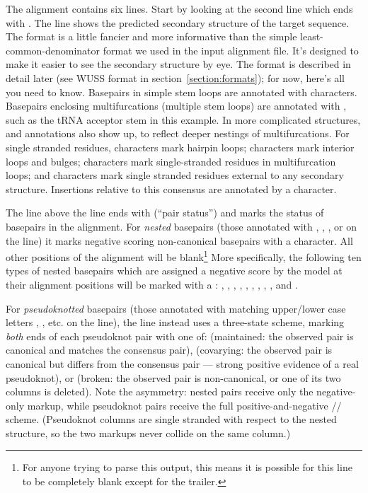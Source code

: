 The alignment contains six lines. Start by looking at the second line
which ends with .  The line shows the predicted secondary
structure of the target sequence. The format is a little fancier and
more informative than the simple least-common-denominator format we
used in the input alignment file. It's designed to make it easier to
see the secondary structure by eye. The format is described in detail
later (see WUSS format in section~\ref{section:formats}); for now,
here's all you need to know. Basepairs in simple stem loops are
annotated with \otext{<>} characters. Basepairs enclosing
multifurcations (multiple stem loops) are annotated with \otext{()},
such as the tRNA acceptor stem in this example. In more complicated
structures, \otext{[]} and \otext{\{\}} annotations also show up, to
reflect deeper nestings of multifurcations. For single stranded
residues, \otext{\_} characters mark hairpin loops; \otext{-}
characters mark interior loops and bulges; \otext{,} characters mark
single-stranded residues in multifurcation loops; and \otext{:}
characters mark single stranded residues external to any secondary
structure. Insertions relative to this consensus are annotated by a
 character.

The line above the  line ends with  (``pair
status'') and marks the status of basepairs in the alignment. For
\emph{nested} basepairs (those annotated with \otext{<>}, \otext{()},
\otext{[]}, or \otext{\{\}} on the  line) it marks negative
scoring non-canonical basepairs with a  character. All other
positions of the alignment will be
blank\footnote{For anyone trying to parse this output, this means it
is possible for this line to be completely blank except for the
 trailer.} More specifically, the following ten types of
nested basepairs which are assigned a negative score by the model at
their alignment positions will be marked with a : ,
, , , , ,
, , , and .

For \emph{pseudoknotted} basepairs (those annotated with matching
upper/lower case letters , , etc. on the
 line), the  line instead uses a three-state
scheme, marking \emph{both} ends of each pseudoknot pair with one of:
\otext{=} (maintained: the observed pair is canonical and matches the
consensus pair), \otext{\$} (covarying: the observed pair is canonical
but differs from the consensus pair --- strong positive evidence of a
real pseudoknot), or  (broken: the observed pair is
non-canonical, or one of its two columns is deleted). Note the
asymmetry: nested pairs receive only the negative-only 
markup, while pseudoknot pairs receive the full positive-and-negative
\otext{=}/\otext{\$}/ scheme. (Pseudoknot columns are single
stranded with respect to the nested structure, so the two markups never
collide on the same column.)

